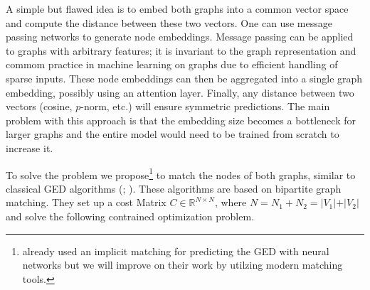 A simple but flawed idea is to embed both graphs into a common vector space and compute the distance between these two vectors. One can use message passing networks to generate node embeddings. Message passing can be applied to graphs with arbitrary features; it is invariant to the graph representation and commom practice in machine learning on graphs due to efficient handling of sparse inputs. These node embeddings can then be aggregated into a single graph embedding, possibly using an attention layer. Finally, any distance between two vectors (cosine, $p$-norm, etc.) will ensure symmetric predictions. The main problem with this approach is that the embedding size becomes a bottleneck for larger graphs and the entire model would need to be trained from scratch to increase it.

To solve the problem we propose\footnote{\cite{riba2018} already used an implicit matching for predicting the GED with neural networks but we will improve on their work by utilzing modern matching tools.} to match the nodes of both graphs, similar to classical GED algorithms (\citealp{hungarian2009}; \citealp{frankhauser2011}). These algorithms are based on bipartite graph matching. They set up a cost Matrix $C \in \mathbb{R}^{N \times N}$, where $N = N_1 + N_2 = \vert V_1 \vert + \vert V_2 \vert $ and solve the following contrained optimization problem.

\vspace{.2cm}


